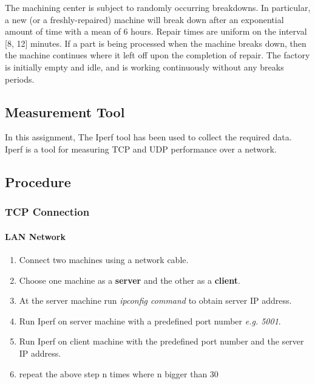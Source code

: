 \documentclass[aps,letterpaper,10pt]{revtex4}
\begin{document}
The machining center is subject to randomly occurring breakdowns. In particular, a new (or a
freshly-repaired) machine will break down after an exponential amount of time with a mean of 6 hours. Repair times are uniform on the interval [8, 12] minutes. If a part is being processed when the machine breaks down, then the machine continues where it left off upon the completion of repair. The factory is initially empty and idle, and is working continuously without any breaks periods.
\subsection{Measurement Tool}
In this assignment, The Iperf tool has been used to collect the required data. Iperf is a tool for measuring TCP and UDP performance over a network.
\subsection{Procedure}
    \subsubsection{TCP Connection}
        \paragraph{LAN Network}    
        	\begin{enumerate}
        		\item Connect two machines using a network cable.
        		\item Choose one machine as a \textbf{server} and the other as a \textbf{client}.
        		\item At the server machine run \textit{ipconfig command} to obtain server IP address.
        		\item Run Iperf on server machine with a predefined port number \textit{e.g. 5001}. 
        		\item Run Iperf on client machine with the predefined port number and the server IP address.
        		\item repeat the above step n times where n bigger than 30
        	\end{enumerate}
\vspace{3mm}  
\end{document}

